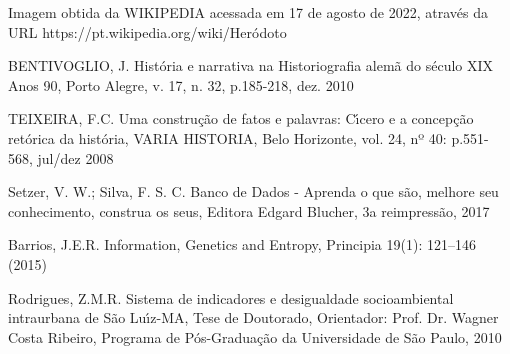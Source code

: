 \documentclass[
12pt,		%
openright,	%
twoside,  %
a4paper,			%
chapter=TITLE,		%
english,			%
french,				%
spanish,			%
brazil				%
]{USPSC-classe/USPSC}
\begin{document}
\begin{flushleft}
\begin{flushleft}
[WIKIPEDIA, 2022] Imagem obtida da WIKIPEDIA acessada em 17 de agosto de 2022, atrav\'es da URL https://pt.wikipedia.org/wiki/Her\'odoto
\end{flushleft}


\end{flushleft}


\begin{flushleft}
\begin{flushleft}
[BENTIVOGLIO, 2010] BENTIVOGLIO, J. Hist\'oria e narrativa na Historiografia alem\~a do s\'eculo XIX Anos 90, Porto Alegre, v. 17, n. 32, p.185-218, dez. 2010
\end{flushleft}


\end{flushleft}


\begin{flushleft}
\begin{flushleft}
[TEIXEIRA, 2008] TEIXEIRA, F.C. Uma constru\c{c}\~ao de fatos e palavras: C\'{\i}cero e a concep\c{c}\~ao ret\'orica da hist\'oria, VARIA HISTORIA, Belo Horizonte, vol. 24, nº 40: p.551-568, jul/dez 2008
\end{flushleft}


\end{flushleft}


\begin{flushleft}
\begin{flushleft}
 Setzer, V. W.; Silva, F. S. C. Banco de Dados - Aprenda o que s\~ao, melhore seu conhecimento, construa os seus, Editora Edgard Blucher, 3a reimpress\~ao, 2017
\end{flushleft}


\end{flushleft}


\begin{flushleft}
\begin{flushleft}
[Barrios, 2015] Barrios, J.E.R. Information, Genetics and Entropy, Principia 19(1): 121–146 (2015)
\end{flushleft}


\end{flushleft}


\begin{flushleft}
\begin{flushleft}
[Rodrigues, 2010] Rodrigues, Z.M.R. Sistema de indicadores e desigualdade socioambiental intraurbana de S\~ao Lu\'{\i}z-MA, Tese de Doutorado, Orientador: Prof. Dr. Wagner Costa Ribeiro, Programa de P\'os-Gradua\c{c}\~ao da Universidade de S\~ao Paulo, 2010
\end{flushleft}


\end{flushleft}
\end{document}
